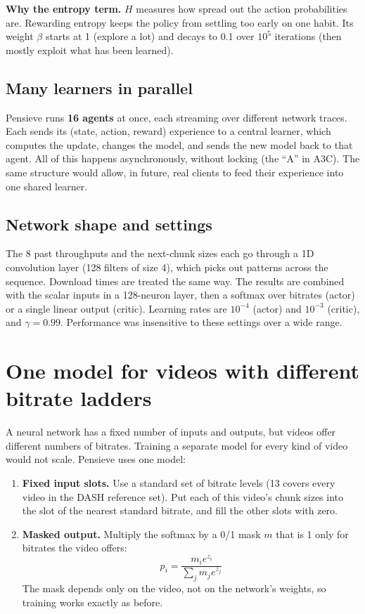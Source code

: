 \textbf{Why the entropy term.} $H$ measures how spread out the action probabilities are. Rewarding entropy keeps the policy from settling too early on
one habit. Its weight $\beta$ starts at 1 (explore a lot) and decays to 0.1 over $10^5$ iterations (then mostly exploit what has been learned).

\subsection{Many learners in parallel}
Pensieve runs \textbf{16 agents} at once, each streaming over different network traces. Each sends its (state, action, reward) experience to a
central learner, which computes the update, changes the model, and sends the new model back to that agent. All of this happens asynchronously,
without locking (the ``A'' in A3C). The same structure would allow, in future, real clients to feed their experience into one shared learner.

\subsection{Network shape and settings}
The 8 past throughputs and the next-chunk sizes each go through a 1D convolution layer (128 filters of size 4), which picks out patterns across the
sequence. Download times are treated the same way. The results are combined with the scalar inputs in a 128-neuron layer, then a softmax over bitrates
(actor) or a single linear output (critic). Learning rates are $10^{-4}$ (actor) and $10^{-3}$ (critic), and $\gamma = 0.99$. Performance was insensitive
to these settings over a wide range.

\section{One model for videos with different bitrate ladders}


A neural network has a fixed number of inputs and outputs, but videos offer different numbers of bitrates. Training a separate model for every
kind of video would not scale. Pensieve uses one model:
\begin{enumerate}
  \item \textbf{Fixed input slots.} Use a standard set of bitrate levels (13 covers every video in the DASH reference set). Put each of this video's
        chunk sizes into the slot of the nearest standard bitrate, and fill the other slots with zero.
  \item \textbf{Masked output.} Multiply the softmax by a 0/1 mask $m$ that is 1 only for bitrates the video offers:
        \[ p_i = \frac{m_i e^{z_i}}{\sum_j m_j e^{z_j}} \]
        The mask depends only on the video, not on the network's weights, so training works exactly as before.
\end{enumerate}

